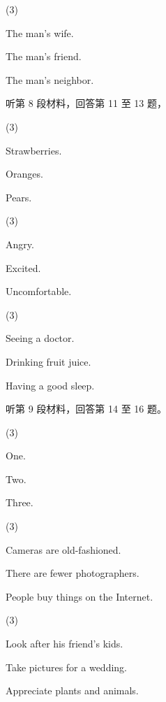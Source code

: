 \documentclass{英语试卷}
\begin{document}
\begin{choices}(3)
  \item The man's wife.
  \item The man's friend.
  \item The man's neighbor.
\end{choices}
\par 听第 8 段材料，回答第 11 至 13 题，\par
{}
\begin{choices}(3)
  \item Strawberries.
  \item Oranges.
  \item Pears.
\end{choices}
\begin{choices}(3)
  \item Angry.
  \item Excited.
  \item Uncomfortable.
\end{choices}
\begin{choices}(3)
  \item Seeing a doctor.
  \item Drinking fruit juice.
  \item Having a good sleep.
\end{choices}
\par 听第 9 段材料，回答第 14 至 16 题。\par
{}
\begin{choices}(3)
  \item One.
  \item Two.
  \item Three.
\end{choices}
\begin{choices}(3)
  \item Cameras are old-fashioned.
  \item There are fewer photographers.
  \item People buy things on the Internet.
\end{choices}
\begin{choices}(3)
  \item Look after his friend's kids.
  \item Take pictures for a wedding.
  \item Appreciate plants and animals.
\end{choices}
\end{document}
